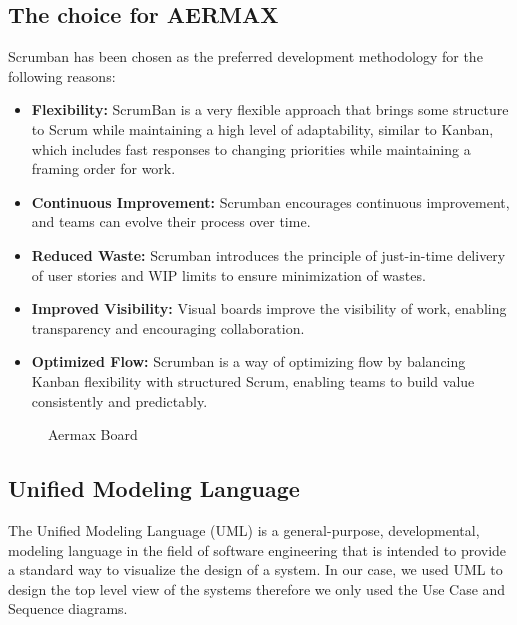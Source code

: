 \subsection{The choice for AERMAX}
Scrumban has been chosen as the preferred development methodology for the following reasons:
\begin{itemize}
    \item \textbf{Flexibility:} ScrumBan is a very flexible approach that brings some structure to Scrum while maintaining a high level of adaptability, similar to Kanban, which includes fast responses to changing priorities while maintaining a framing order for work.
    \item \textbf{Continuous Improvement:} Scrumban encourages continuous improvement, and teams can evolve their process over time.
    \item \textbf{Reduced Waste:} Scrumban introduces the principle of just-in-time delivery of user stories and WIP limits to ensure minimization of wastes.
    \item \textbf{Improved Visibility:} Visual boards improve the visibility of work, enabling transparency and encouraging collaboration.
    \item \textbf{Optimized Flow:} Scrumban is a way of optimizing flow by balancing Kanban flexibility with structured Scrum, enabling teams to build value consistently and predictably.
\end{itemize}

\begin{figure}[H]
    \centering
    \caption{Aermax Board}
    \label{fig:armax-board}
\end{figure}
 
\newpage
\subsection{Unified Modeling Language}
The Unified Modeling Language (UML) is a general-purpose, developmental, modeling language in the field of software engineering that is intended to provide a standard way to visualize the design of a system. In our case, we used UML to design the top level view of the systems therefore we only used the Use Case and Sequence diagrams.



